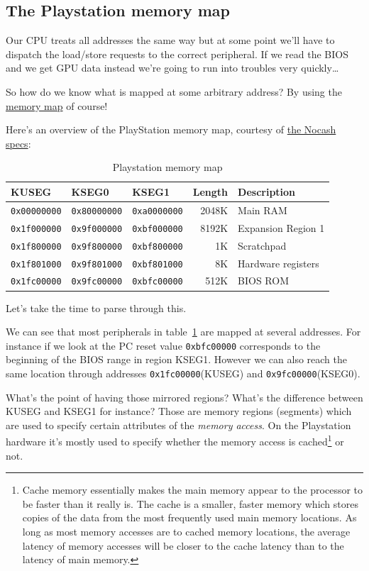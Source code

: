 \documentclass[a4paper]{article}
\newcommand{\code}[1] {\texttt{#1}}
\begin{document}
\subsection{The Playstation memory map}

Our CPU treats all addresses the same way but at some point we'll have
to dispatch the load/store requests to the correct peripheral. If we
read the BIOS and we get GPU data instead we're going to run into
troubles very quickly\dots{}

So how do we know what is mapped at some arbitrary address? By using
the \href{https://en.wikipedia.org/wiki/Memory_map}{memory map} of
course!

Here's an overview of the PlayStation memory map, courtesy of
\href{http://problemkaputt.de/psx-spx.htm#cpuspecifications}{the Nocash
  specs}:

\begin{table}[ht]
  \centering

  \begin{tabular}{ l | l | l | r | l }
    KUSEG & KSEG0 & KSEG1 & Length & Description \\
    \hline
    \code{0x00000000} & \code{0x80000000} & \code{0xa0000000} & 2048K
     & Main RAM \\
    \code{0x1f000000} & \code{0x9f000000} & \code{0xbf000000} & 8192K
     & Expansion Region 1 \\
    \code{0x1f800000} & \code{0x9f800000} & \code{0xbf800000} &    1K
     & Scratchpad \\
    \code{0x1f801000} & \code{0x9f801000} & \code{0xbf801000} &    8K
     & Hardware registers \\
    \code{0x1fc00000} & \code{0x9fc00000} & \code{0xbfc00000} &  512K
     & BIOS ROM \\
  \end{tabular}

  \caption{Playstation memory map}
  \label{tab:mmap}
\end{table}

Let's take the time to parse through this.

We can see that most peripherals in table~\ref{tab:mmap} are mapped at
several addresses. For instance if we look at the PC reset
value \code{0xbfc00000} corresponds to the beginning of the BIOS range in
region KSEG1. However we can also reach the same location through
addresses \code{0x1fc00000}(KUSEG) and \code{0x9fc00000}(KSEG0).

What's the point of having those mirrored regions? What's the
difference between KUSEG and KSEG1 for instance? Those are memory
regions (segments) which are used to specify certain attributes of the \emph{memory
access}. On the Playstation hardware it's mostly used to specify
whether the memory access is cached\footnote{Cache memory essentially makes
  the main memory appear to the processor to be faster than it really is.
  The cache is a smaller, faster memory which stores copies of the data
  from the most frequently used main memory locations. As long as most memory
  accesses are to cached memory locations, the average latency of memory
  accesses will be closer to the cache latency than to the latency of main memory.} or not.
\end{document}
